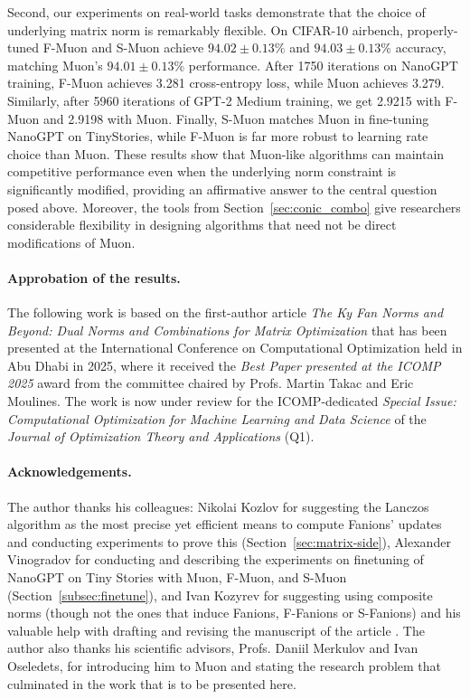 \documentclass[a4paper,14pt,oneside]{extarticle}
\newcommand{\sectionref}[1]{Section~\ref{#1}}
\begin{document}
Second, our experiments on real-world tasks demonstrate that the choice of underlying matrix norm is remarkably flexible. On CIFAR-10 airbench, properly-tuned F-Muon and S-Muon achieve $94.02 \pm 0.13\%$ and $94.03 \pm 0.13\%$ accuracy, matching Muon's $94.01 \pm 0.13\%$ performance. After 1750 iterations on NanoGPT training, F-Muon achieves 3.281 cross-entropy loss, while Muon achieves 3.279. Similarly, after 5960 iterations of GPT-2 Medium training, we get 2.9215 with F-Muon and 2.9198 with Muon. Finally, S-Muon matches Muon in fine-tuning NanoGPT on TinyStories, while F-Muon is far more robust to learning rate choice than Muon. These results show that Muon-like algorithms can maintain competitive performance even when the underlying norm constraint is significantly modified, providing an affirmative answer to the central question posed above. Moreover, the tools from \sectionref{sec:conic_combo} give researchers considerable flexibility in designing algorithms that need not be direct modifications of Muon.

\paragraph{Approbation of the results.} The following work is based on the first-author article \emph{The Ky Fan Norms and Beyond: Dual Norms and Combinations for Matrix Optimization} \citep{kravatskiy2025kyfannormsbeyond} that has been presented at the International Conference on Computational Optimization held in Abu Dhabi in 2025, where it received the \emph{Best Paper presented at the ICOMP 2025} award from the committee chaired by Profs. Martin Takac and Eric Moulines. The work is now under review for the ICOMP-dedicated \emph{Special Issue: Computational Optimization for Machine Learning and Data Science} of the \emph{Journal of Optimization Theory and Applications} (Q1).

\paragraph{Acknowledgements.} The author thanks his colleagues: Nikolai Kozlov for suggesting the Lanczos algorithm as the most precise yet efficient means to compute Fanions' updates and conducting experiments to prove this (\sectionref{sec:matrix-side}), Alexander Vinogradov for conducting and describing the experiments on finetuning of NanoGPT on Tiny Stories with Muon, F-Muon, and S-Muon (\sectionref{subsec:finetune}), and Ivan Kozyrev for suggesting using composite norms (though not the ones that induce Fanions, F-Fanions or S-Fanions) and his valuable help with drafting and revising the manuscript of the article \citep{kravatskiy2025kyfannormsbeyond}. The author also thanks his scientific advisors, Profs. Daniil Merkulov and Ivan Oseledets, for introducing him to Muon and stating the research problem that culminated in the work that is to be presented here.
\end{document}
